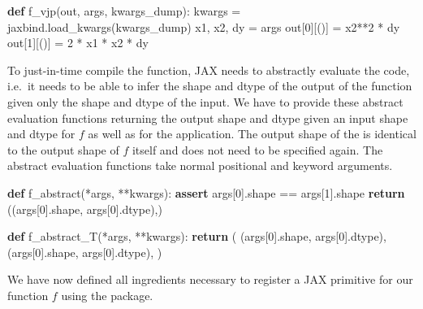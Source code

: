 \documentclass[10pt,a4paper,onecolumn]{article}
\let\textttOrig=\texttt
\def\texttt#1{\expandafter\textttOrig{\seqsplit{#1}}}
\newenvironment{Shaded}{}{}
\newcommand{\ControlFlowTok}[1]{\textcolor[rgb]{0.00,0.44,0.13}{\textbf{#1}}}
\newcommand{\DecValTok}[1]{\textcolor[rgb]{0.25,0.63,0.44}{#1}}
\newcommand{\KeywordTok}[1]{\textcolor[rgb]{0.00,0.44,0.13}{\textbf{#1}}}
\newcommand{\NormalTok}[1]{#1}
\newcommand{\OperatorTok}[1]{\textcolor[rgb]{0.40,0.40,0.40}{#1}}
\begin{document}
\begin{Shaded}
\begin{Highlighting}[]
\KeywordTok{def}\NormalTok{ f\_vjp(out, args, kwargs\_dump):}
\NormalTok{    kwargs }\OperatorTok{=}\NormalTok{ jaxbind.load\_kwargs(kwargs\_dump)}
\NormalTok{    x1, x2, dy }\OperatorTok{=}\NormalTok{ args}
\NormalTok{    out[}\DecValTok{0}\NormalTok{][()] }\OperatorTok{=}\NormalTok{ x2}\OperatorTok{**}\DecValTok{2} \OperatorTok{*}\NormalTok{ dy}
\NormalTok{    out[}\DecValTok{1}\NormalTok{][()] }\OperatorTok{=} \DecValTok{2} \OperatorTok{*}\NormalTok{ x1 }\OperatorTok{*}\NormalTok{ x2 }\OperatorTok{*}\NormalTok{ dy}
\end{Highlighting}
\end{Shaded}

To just-in-time compile the function, JAX needs to abstractly evaluate
the code, i.e.~it needs to be able to infer the shape and dtype of the
output of the function given only the shape and dtype of the input. We
have to provide these abstract evaluation functions returning the output
shape and dtype given an input shape and dtype for \(f\) as well as for
the \texttt{vjp} application. The output shape of the \texttt{jvp} is
identical to the output shape of \(f\) itself and does not need to be
specified again. The abstract evaluation functions take normal
positional and keyword arguments.

\begin{Shaded}
\begin{Highlighting}[]
\KeywordTok{def}\NormalTok{ f\_abstract(}\OperatorTok{*}\NormalTok{args, }\OperatorTok{**}\NormalTok{kwargs):}
    \ControlFlowTok{assert}\NormalTok{ args[}\DecValTok{0}\NormalTok{].shape }\OperatorTok{==}\NormalTok{ args[}\DecValTok{1}\NormalTok{].shape}
    \ControlFlowTok{return}\NormalTok{ ((args[}\DecValTok{0}\NormalTok{].shape, args[}\DecValTok{0}\NormalTok{].dtype),)}

\KeywordTok{def}\NormalTok{ f\_abstract\_T(}\OperatorTok{*}\NormalTok{args, }\OperatorTok{**}\NormalTok{kwargs):}
    \ControlFlowTok{return}\NormalTok{ (}
\NormalTok{        (args[}\DecValTok{0}\NormalTok{].shape, args[}\DecValTok{0}\NormalTok{].dtype),}
\NormalTok{        (args[}\DecValTok{0}\NormalTok{].shape, args[}\DecValTok{0}\NormalTok{].dtype),}
\NormalTok{    )}
\end{Highlighting}
\end{Shaded}

We have now defined all ingredients necessary to register a JAX
primitive for our function \(f\) using the \texttt{JAXbind} package.
\end{document}
